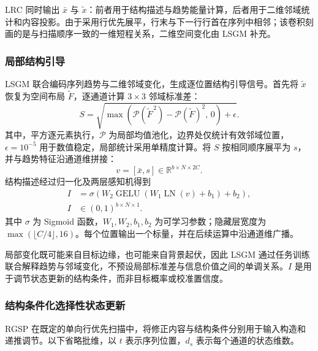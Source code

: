 \documentclass[journal]{IEEEtran}
\begin{document}
LRC 同时输出 $\bar{x}$ 与 $\tilde{x}$：前者用于结构描述与趋势能量计算，后者用于二维邻域统计和内容投影。由于采用行优先展平，行末与下一行行首在序列中相邻；该卷积刻画的是与扫描顺序一致的一维短程关系，二维空间变化由 LSGM 补充。


\subsubsection{局部结构引导}
\label{sec:lsgm}

LSGM 联合编码序列趋势与二维邻域变化，生成逐位置结构引导信号。首先将 $\tilde{x}$ 恢复为空间布局 $\widetilde{F}$，逐通道计算 $3\times3$ 邻域标准差：
\begin{equation}
S=
\sqrt{
\max\!\left(
\mathcal{P}(\widetilde{F}^{\,2})
-\mathcal{P}(\widetilde{F})^2,\,0
\right)+\epsilon
}.
\label{eq:local_std}
\end{equation}
其中，平方逐元素执行，$\mathcal{P}$ 为局部均值池化，边界处仅统计有效邻域位置，$\epsilon=10^{-5}$ 用于数值稳定，局部统计采用单精度计算。将 $S$ 按相同顺序展平为 $s$，并与趋势特征沿通道维拼接：
\begin{equation}
v=[\bar{x},s]
\in\mathbb{R}^{b\times N\times2C}.
\label{eq:structural_descriptor}
\end{equation}
结构描述经过归一化及两层感知机得到
\begin{equation}
\begin{aligned}
I&=\sigma\!\left(
W_2\operatorname{GELU}\!\left(
W_1\operatorname{LN}(v)+b_1
\right)+b_2
\right),\\
I&\in(0,1)^{b\times N\times1}.
\end{aligned}
\label{eq:importance}
\end{equation}
其中 $\sigma$ 为 Sigmoid 函数，$W_1,W_2,b_1,b_2$ 为可学习参数；隐藏层宽度为 $\max(\lfloor C/4\rfloor,16)$。每个位置输出一个标量，并在后续运算中沿通道维广播。

局部变化既可能来自目标边缘，也可能来自背景起伏，因此 LSGM 通过任务训练联合解释趋势与邻域变化，不预设局部标准差与信息价值之间的单调关系。$I$ 是用于调节状态更新的结构条件，而非目标概率或校准置信度。


\subsubsection{结构条件化选择性状态更新}
\label{sec:structure_conditioned_ssm}

RGSP 在既定的单向行优先扫描中，将修正内容与结构条件分别用于输入构造和递推调节。以下省略批维，以 $t$ 表示序列位置，$d_s$ 表示每个通道的状态维数。
\end{document}

